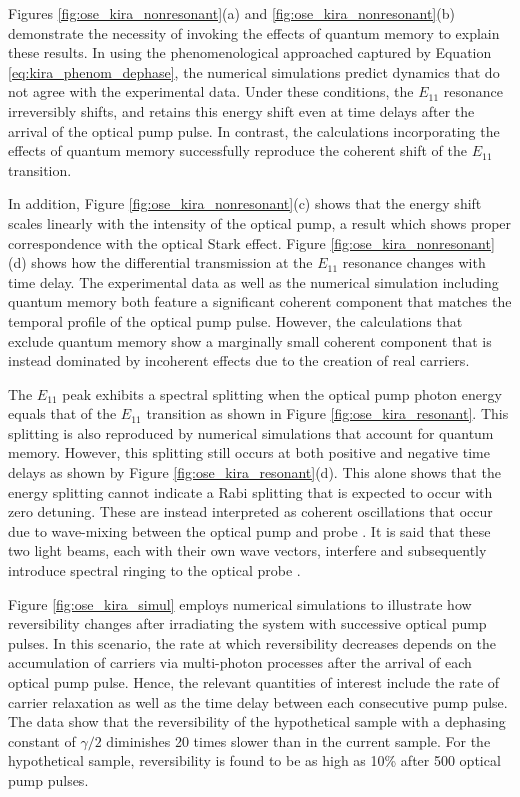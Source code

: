 Figures \ref{fig:ose_kira_nonresonant}(a) and \ref{fig:ose_kira_nonresonant}(b) demonstrate the necessity of invoking the effects of quantum memory to explain these results. In using the phenomenological approached captured by Equation \eqref{eq:kira_phenom_dephase}, the numerical simulations predict dynamics that do not agree with the experimental data. Under these conditions, the $E_{11}$ resonance irreversibly shifts, and retains this energy shift even at time delays after the arrival of the optical pump pulse. In contrast, the calculations incorporating the effects of quantum memory successfully reproduce the coherent shift of the $E_{11}$ transition.

In addition, Figure \ref{fig:ose_kira_nonresonant}(c) shows that the energy shift scales linearly with the intensity of the optical pump, a result which shows proper correspondence with the optical Stark effect. Figure \ref{fig:ose_kira_nonresonant}(d) shows how the differential transmission at the $E_{11}$ resonance changes with time delay. The experimental data as well as the numerical simulation including quantum memory both feature a significant coherent component that matches the temporal profile of the optical pump pulse. However, the calculations that exclude quantum memory show a marginally small coherent component that is instead dominated by incoherent effects due to the creation of real carriers.

The $E_{11}$ peak exhibits a spectral splitting when the optical pump photon energy equals that of the $E_{11}$ transition as shown in Figure \ref{fig:ose_kira_resonant}. This splitting is also reproduced by numerical simulations that account for quantum memory. However, this splitting still occurs at both positive and negative time delays as shown by Figure \ref{fig:ose_kira_resonant}(d). This alone shows that the energy splitting cannot indicate a Rabi splitting that is expected to occur with zero detuning. These are instead interpreted as coherent oscillations that occur due to wave-mixing between the optical pump and probe \cite{joffre1988coherent}. It is said that these two light beams, each with their own wave vectors, interfere and subsequently introduce spectral ringing to the optical probe \cite{joffre1988coherent}.

Figure \ref{fig:ose_kira_simul} employs numerical simulations to illustrate how reversibility changes after irradiating the system with successive optical pump pulses. In this scenario, the rate at which reversibility decreases depends on the accumulation of carriers via multi-photon processes after the arrival of each optical pump pulse. Hence, the relevant quantities of interest include the rate of carrier relaxation as well as the time delay between each consecutive pump pulse. The data show that the reversibility of the hypothetical sample with a dephasing constant of $\gamma/2$ diminishes 20 times slower than in the current sample. For the hypothetical sample, reversibility is found to be as high as 10\% after 500 optical pump pulses.

